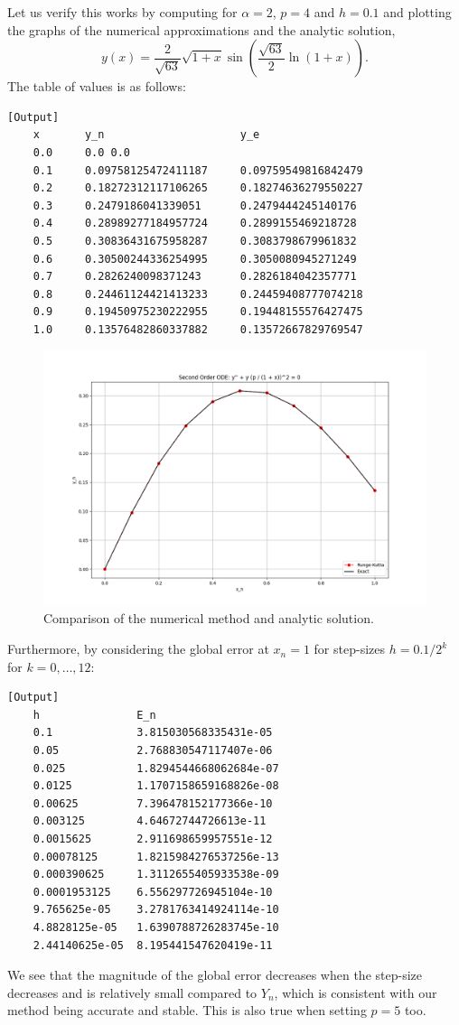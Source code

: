 \documentclass{article}
\begin{document}
Let us verify this works by computing for \(\alpha = 2\), \(p = 4\) and \(h = 0.1\) and plotting the graphs of the numerical approximations and the analytic solution,
\[
    y(x) = \frac{2}{\sqrt{63}} \sqrt{1 + x} \sin\left( \frac{\sqrt{63}}{2} \ln(1 + x) \right).
\]
The table of values is as follows:
\begin{verbatim}[Output]
    x       y_n                     y_e
    0.0     0.0 0.0
    0.1     0.09758125472411187     0.09759549816842479
    0.2     0.18272312117106265     0.18274636279550227
    0.3     0.2479186041339051      0.2479444245140176
    0.4     0.28989277184957724     0.2899155469218728
    0.5     0.30836431675958287     0.3083798679961832
    0.6     0.30500244336254995     0.3050080945271249
    0.7     0.2826240098371243      0.2826184042357771
    0.8     0.24461124421413233     0.24459408777074218
    0.9     0.19450975230222955     0.19448155576427475
    1.0     0.13576482860337882     0.13572667829769547
\end{verbatim}

\begin{figure}
    \centering
    \includegraphics[width=1.0\textwidth]{images/second_order.png}
    \caption{Comparison of the numerical method and analytic solution.}
\end{figure}

Furthermore, by considering the global error at \(x_n = 1\) for step-sizes \(h = 0.1 / 2^k\) for \(k = 0, \dots, 12\):
\begin{verbatim}[Output]
    h               E_n
    0.1             3.815030568335431e-05
    0.05            2.768830547117407e-06
    0.025           1.8294544668062684e-07
    0.0125          1.1707158659168826e-08
    0.00625         7.396478152177366e-10
    0.003125        4.64672744726613e-11
    0.0015625       2.911698659957551e-12
    0.00078125      1.8215984276537256e-13
    0.000390625     1.3112655405933538e-09
    0.0001953125    6.556297726945104e-10
    9.765625e-05    3.2781763414924114e-10
    4.8828125e-05   1.6390788726283745e-10
    2.44140625e-05  8.195441547620419e-11
\end{verbatim}
We see that the magnitude of the global error decreases when the step-size decreases and is relatively small compared to \(Y_n\), which is consistent with our method being accurate and stable. This is also true when setting \(p = 5\) too.
\end{document}
